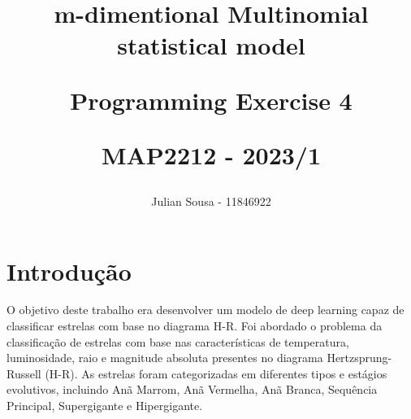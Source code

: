 \documentclass[11pt]{article}
\theoremstyle{definition}
\begin{document}
\newcommand{\bvec}{\mathbf}
\newcommand*\Dcancelto[2][0]{%
  \kern9pt%
  \begin{tikzpicture}[baseline=(current bounding box.center).anchor=west]
    \node[anchor=east,inner sep=2pt] (a) {#2};
    \draw[->] ($(a.north west)+(1pt,-2pt)$) -- ($(a.south east)+(0pt,2pt)$) node at ($(a.south east)+(4pt,1pt)$) {$\canc{#1}$};
\end{tikzpicture}
}



\lstset{style=mystyle}




\title{
    \begin{center}
        \textbf{m-dimentional Multinomial statistical model}
    \end{center}
    \begin{center}
        \textbf{Programming Exercise 4}
    \end{center}
\large MAP2212 - 2023/1
}
\author{Julian Sousa - 11846922}
\date{}
\maketitle
\section{Introdução}
O objetivo deste trabalho era desenvolver um modelo de deep learning capaz de classificar estrelas com base no diagrama H-R. Foi abordado o problema da classificação de estrelas com base nas características de temperatura, luminosidade, raio e magnitude absoluta presentes no diagrama Hertzsprung-Russell (H-R). As estrelas foram categorizadas em diferentes tipos e estágios evolutivos, incluindo Anã Marrom, Anã Vermelha, Anã Branca, Sequência Principal, Supergigante e Hipergigante.
\end{document}
